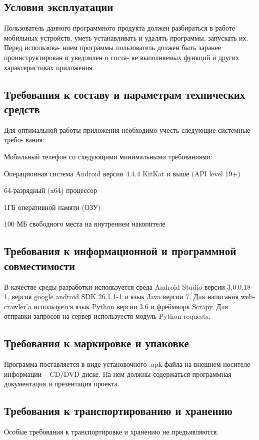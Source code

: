 \subsection{Условия эксплуатации}
Пользователь данного программного продукта должен разбираться в работе мобильных
устройств, уметь устанавливать и удалять программы, запускать их. Перед использова-
нием программы пользователь должен быть заранее проинструктирован и уведомлен о соста-
ве выполняемых функций и других характеристиках приложения.

\subsection{Требования к составу и параметрам технических средств}
Для оптимальной работы приложения необходимо учесть следующие системные требо-
вания:
\begin{my_enumerate}
    \item Мобильный телефон со следующими минимальными требованиями:
        \begin{my_enumerate}
            \item Операционная система Android версии 4.4.4 KitKat и выше (API level 19+)
            \item 64-разрядный (x64) процессор
            \item 1ГБ оперативной памяти (ОЗУ)
            \item 100 МБ свободного места на внутреннем накопителе
        \end{my_enumerate}
\end{my_enumerate}

\subsection{Требования к информационной и программной совместимости}
В качестве среды разработки используется среда Android Studio версии
3.0.0.18-1, версия google android SDK 26.1.1-1 и язык Java версии 7.
Для написания web-crawler'a используется язык Python версии 3.6 и
фреймворк Scrapy. Для отправки запросов на сервер используестя модуль Python requests.

\subsection{Требования к маркировке и упаковке}
Программа поставляется в виде установочного .apk файла на внешнем носителе
информации – CD/DVD диске. На нем должны содержаться программная
документация и презентация проекта.

\subsection{Требования к транспортированию и хранению}
Особые требования к транспортировке и хранению не предъявляются.


